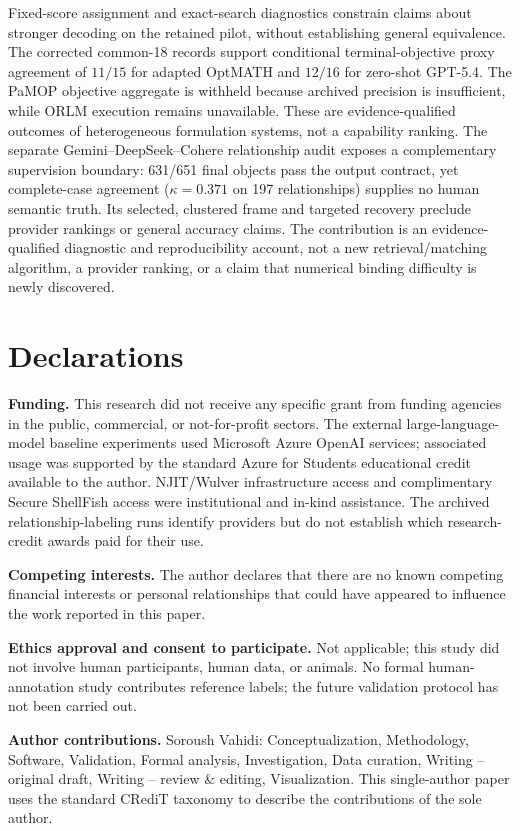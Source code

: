 \documentclass[pdflatex,sn-basic,Numbered]{sn-jnl}
\begin{document}
Fixed-score assignment and exact-search diagnostics constrain claims about stronger decoding on the retained pilot, without establishing general equivalence. The corrected common-18 records support conditional terminal-objective proxy agreement of $11/15$ for adapted OptMATH and $12/16$ for zero-shot GPT-5.4. The PaMOP objective aggregate is withheld because archived precision is insufficient, while ORLM execution remains unavailable. These are evidence-qualified outcomes of heterogeneous formulation systems, not a capability ranking. The separate Gemini--DeepSeek--Cohere relationship audit exposes a complementary supervision boundary: 631/651 final objects pass the output contract, yet complete-case agreement ($\kappa=0.371$ on 197 relationships) supplies no human semantic truth. Its selected, clustered frame and targeted recovery preclude provider rankings or general accuracy claims. The contribution is an evidence-qualified diagnostic and reproducibility account, not a new retrieval/matching algorithm, a provider ranking, or a claim that numerical binding difficulty is newly discovered.
\backmatter

\section*{Declarations}

\noindent\textbf{Funding.} This research did not receive any specific grant from funding agencies in the public, commercial, or not-for-profit sectors. The external large-language-model baseline experiments used Microsoft Azure OpenAI services; associated usage was supported by the standard Azure for Students educational credit available to the author. NJIT/Wulver infrastructure access and complimentary Secure ShellFish access were institutional and in-kind assistance. The archived relationship-labeling runs identify providers but do not establish which research-credit awards paid for their use.

\noindent\textbf{Competing interests.} The author declares that there are no known competing financial interests or personal relationships that could have appeared to influence the work reported in this paper.

\noindent\textbf{Ethics approval and consent to participate.} Not applicable; this study did not involve human participants, human data, or animals. No formal human-annotation study contributes reference labels; the future validation protocol has not been carried out.

\noindent\textbf{Author contributions.} Soroush Vahidi: Conceptualization, Methodology, Software, Validation, Formal analysis, Investigation, Data curation, Writing -- original draft, Writing -- review \& editing, Visualization. This single-author paper uses the standard CRediT taxonomy to describe the contributions of the sole author.
\end{document}
